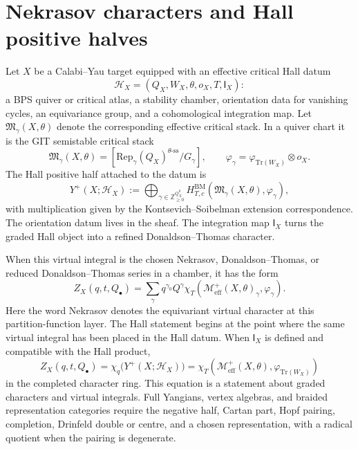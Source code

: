 \providecommand{\CoHA}{\mathrm{CoHA}}
\providecommand{\Yp}{Y^{+}}
\providecommand{\Hilb}{\mathrm{Hilb}}
\providecommand{\Meff}{\mathcal{M}^{+}_{\mathrm{eff}}}
\providecommand{\Rep}{\mathrm{Rep}}
\providecommand{\chq}{\chi_q}
\providecommand{\gghone}{\widehat{\mathfrak{gl}}_1}
\providecommand{\Eone}{E_1}
\providecommand{\Etwo}{E_2}
\providecommand{\IgusaOP}{\Phi_{10}^{\mathrm{OP}}}
\providecommand{\Igusaun}{\Phi_{10}^{\mathrm{un}}}
\providecommand{\Deltaf}{\Delta_5}
\providecommand{\Df}{D_5}
\providecommand{\Dh}{\mathcal D_\hbar^\wedge}
\providecommand{\kch}{\kappa_{\mathrm{ch}}}
\providecommand{\kcat}{\kappa_{\mathrm{cat}}}
\providecommand{\kBKM}{\kappa_{\mathrm{BKM}}}
\providecommand{\kfib}{\kappa_{\mathrm{fiber}}}

\section*{Nekrasov characters and Hall positive halves}
\label{wn:nek-char-yplus}

Let $X$ be a Calabi--Yau target equipped with an effective critical
Hall datum
\[
  \mathcal H_X=(Q_X,W_X,\theta,o_X,T,\mathsf I_X):
\]
a BPS quiver or critical atlas, a stability chamber, orientation data
for vanishing cycles, an equivariance group, and a cohomological
integration map. Let \(\mathfrak M_\gamma(X,\theta)\) denote the
corresponding effective critical stack. In a quiver chart it is the
GIT semistable critical stack
\[
  \mathfrak M_\gamma(X,\theta)
  =
  \left[
    \Rep_\gamma(Q_X)^{\theta\text{-ss}}/G_\gamma
  \right],
  \qquad
  \varphi_{\gamma}=\varphi_{\mathrm{Tr}(W_X)}\otimes o_X .
\]
The Hall positive half attached to the datum is
\[
  \Yp(X;\mathcal H_X)
  :=
  \bigoplus_{\gamma\in \mathbb Z_{\geq 0}^{Q_X^0}}
  H^{\mathrm{BM}}_{T,c}\!\left(
    \mathfrak M_\gamma(X,\theta),
    \varphi_{\gamma}
  \right),
\]
with multiplication given by the Kontsevich--Soibelman extension
correspondence. The orientation datum lives in the sheaf. The
integration map \(\mathsf I_X\) turns the graded Hall object into a
refined Donaldson--Thomas character.

When this virtual integral is the chosen Nekrasov, Donaldson--Thomas,
or reduced Donaldson--Thomas series in a chamber, it has the form
\[
  Z_X(q,t,Q_\bullet)
  =
  \sum_{\gamma} q^{\gamma_0}Q^\gamma
  \chi_T\!\left(
    \Meff(X,\theta)_\gamma,
    \varphi_{\gamma}
  \right).
\]
Here the word Nekrasov denotes the equivariant virtual character at
this partition-function layer. The Hall statement begins at the point
where the same virtual integral has been placed in the Hall datum.
When \(\mathsf I_X\) is defined and compatible with the Hall product,
\[
  Z_X(q,t,Q_\bullet)
  =
  \chq\!\bigl(\Yp(X;\mathcal H_X)\bigr)
  =
  \chi_T\!\left(\Meff(X,\theta),\varphi_{\mathrm{Tr}(W_X)}\right)
\]
in the completed character ring. This equation is a statement about
graded characters and virtual integrals. Full Yangians, vertex
algebras, and braided representation categories require the negative
half, Cartan part, Hopf pairing, completion, Drinfeld double or centre,
and a chosen representation, with a radical quotient when the pairing
is degenerate.

